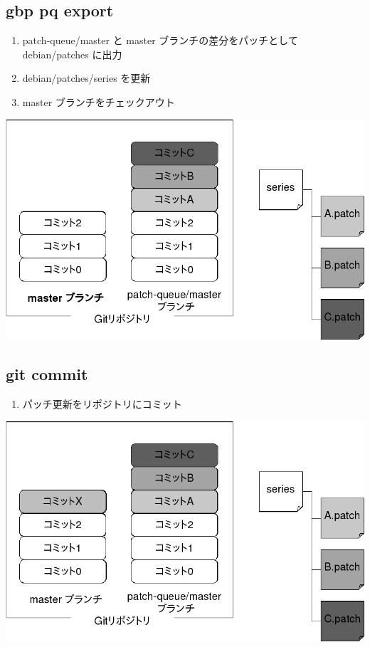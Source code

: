 \documentclass[mingoth,a4paper]{jsarticle}
\begin{document}
\subsection{gbp pq export}
  \begin{enumerate}
   \item patch-queue/master と master ブランチの差分をパッチとして debian/patches に出力
   \item debian/patches/series を更新
   \item master ブランチをチェックアウト
  \end{enumerate}

\begin{center}
\includegraphics[width=0.8\hsize]{image201509/gbp-pq3_mono.png}
\end{center}
  
  

\subsection{git commit}
  \begin{enumerate}
   \item パッチ更新をリポジトリにコミット
  \end{enumerate}

\begin{center}
\includegraphics[width=0.8\hsize]{image201509/gbp-pq4_mono.png}
\end{center}
\end{document}
